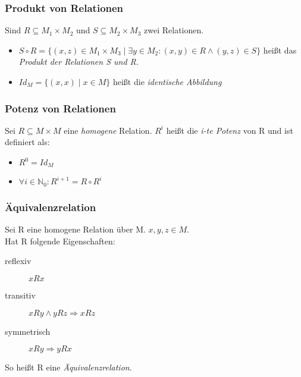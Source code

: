 \begin{frame}
	\frametitle{Produkt von Relationen}
	\begin{definition}
		Sind $R \subseteq M_1 \times M_2$ und $S \subseteq M_2 \times M_3$ zwei Relationen.\\
    \begin{itemize}
			\item $S \circ R = \{(x,z) \in M_1 \times M_3 \mid \exists y \in M_2 : (x,y) \in R \wedge (y,z) \in S \}$ heißt das \emph{Produkt der Relationen S und R}.
			\item $Id_M = \{(x,x) \mid x \in M \}$ heißt die \emph{identische Abbildung}
    \end{itemize}
	\end{definition}
\end{frame}

\begin{frame}
	\frametitle{Potenz von Relationen}
  \begin{definition}
		Sei $R \subseteq M \times M$ eine \emph{homogene} Relation.
    $R^i$ heißt die {\em i-te Potenz} von R und ist definiert als:
    \begin{itemize}
			\item $R^0=Id_M$
			\item $\forall i \in \mathbb N_0: R^{i+1}=R \circ R^i$
    \end{itemize}
	\end{definition}
\end{frame}

\begin{frame}
	\frametitle{Äquivalenzrelation}
	\begin{definition}
    Sei R eine homogene Relation über M. $x, y, z \in M$.\\
    Hat R folgende Eigenschaften:
		\begin{description}
			\item[reflexiv] $x R x$
			\item[transitiv] $x R y \wedge y R z \Rightarrow x R z$
			\item[symmetrisch] $x R y \Rightarrow y R x$
		\end{description}
		So heißt R eine \emph{Äquivalenzrelation}.
	\end{definition}
\end{frame}

